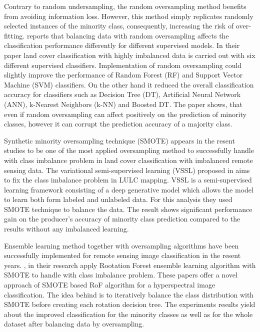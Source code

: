 \documentclass[parskip=full]{scrartcl}
\begin{document}
Contrary to random undersampling, the random oversampling method benefits from
avoiding information loss. However, this method simply replicates randomly
selected instances of the minority class, consequently, increasing the risk of
over-fitting. \cite{Maxwell2018} reports that balancing data with random
oversampling affects the classification performance differently for different
supervised models. In their paper land cover classification with highly
imbalanced data is carried out with six different supervised classifiers.
Implementation of random oversampling could slightly improve the performance of
Random Forest (RF) and Support Vector Machine (SVM) classifiers. On the other
hand it reduced the overall classification accuracy for classifiers such as
Decision Tree (DT), Artificial Neural Network (ANN), k-Nearest Neighbors (k-NN)
and Boosted DT. The paper shows, that even if random oversampling can affect
positively on the prediction of minority classes, however it can corrupt the
prediction accuracy of a majority class.

Synthetic minority oversampling technique (SMOTE) appears in the resent studies
to be one of the most applied oversampling method to successfully handle with
class imbalance problem in land cover classification with imbalanced remote
sensing data. The variational semi-supervised learning (VSSL) proposed in
\cite{Cenggoro2018} aims to fix the class imbalance problem in LULC mapping.
VSSL is a semi-supervised learning framework consisting of a deep generative
model which allows the model to learn both form labeled and unlabeled data. For
this analysis they used SMOTE technique to balance the data. The result shows
significant performance gain on the producer's accuracy of minority class
prediction compared to the results without any imbalanced learning.

Ensemble learning method together with oversampling algorithms have been
successfully implemented for remote sensing image classification in the resent
years. \cite{Feng2018}, \cite{Feng2019} in their research apply Rootation
Forest ensemble learning algorithm with SMOTE to handle with class imbalance
problem. These papers offer a novel approach of SMOTE based RoF algorithm
for a hyperspectral image classification. The idea behind is to iteratively
balance the class distribution with SMOTE before creating each rotation
decision tree. The experiments results yield about the improved classification
for the minority classes as well as for the whole dataset after balancing data
by oversampling.
\end{document}
